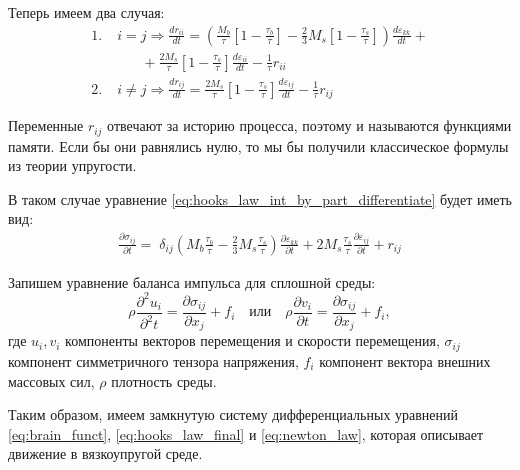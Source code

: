 \documentclass[a4paper, fontsize=14pt]{article}
\begin{document}
Теперь имеем два случая:
\begin{equation}
    \label{eq:brain_funct}
    \begin{aligned}
        1.& \; i = j \Rightarrow \frac{dr_{ii}}{dt} =    \left(\frac{M_b}{\tau} \left[1 - \frac{\tau_b}{\tau} \right] - \frac{2}{3} M_s \left[1 - \frac{\tau_s}{\tau}\right] \right) \frac{d \varepsilon_{kk}}{dt} + \\
        &\qquad +\frac{2 M_s}{\tau} \left[1 - \frac{\tau_s}{\tau} \right] \frac{d \varepsilon_{ii}}{dt} - \frac{1}{\tau} r_{ii} \\
        2.& \; i \neq j \Rightarrow \frac{dr_{ij}}{dt} = \frac{2 M_s}{\tau} \left[1 - \frac{\tau_s}{\tau} \right] \frac{d \varepsilon_{ij}}{dt} - \frac{1}{\tau} r_{ij} 
    \end{aligned}
\end{equation}

Переменные $r_{ij}$ отвечают за историю процесса, поэтому и называются функциями памяти. Если бы они равнялись нулю, то мы бы получили классическое формулы из теории упругости.

В таком случае уравнение \eqref{eq:hooks_law_int_by_part_differentiate} будет иметь вид:
\begin{equation}
    \label{eq:hooks_law_final}
    \begin{aligned}
        \frac{\partial \sigma_{ij}}{\partial t}  = \; \delta_{ij} \left( M_b\frac{\tau_b}{\tau} - \frac{2}{3} M_s \frac{\tau_s}{\tau} \right)  \frac{\partial \varepsilon_{kk}}{\partial t} + 2 M_s \frac{\tau_s}{\tau} \frac{\partial \varepsilon_{ij}}{\partial t} + r_{ij}
    \end{aligned}
\end{equation}

Запишем уравнение баланса импульса для сплошной среды: 
\begin{equation}
    \label{eq:newton_law}
    \rho \frac{\partial^2 u_{i}}{\partial^2 t} = \frac{\partial \sigma_{ij}}{\partial x_j}  + f_{i} \quad \text{или} \quad \rho \frac{\partial v_{i}}{\partial t}  = \frac{\partial \sigma_{ij}}{\partial x_j}  + f_{i},
\end{equation}
где $u_{i}, v_{i}$ компоненты векторов перемещения и скорости перемещения, $\sigma_{ij}$ компонент симметричного тензора напряжения, $f_i$ компонент вектора внешних массовых сил, $\rho$ плотность среды.

Таким образом, имеем замкнутую систему дифференциальных уравнений \eqref{eq:brain_funct}, \eqref{eq:hooks_law_final} и \eqref{eq:newton_law}, которая описывает движение в вязкоупругой среде.
\end{document}
